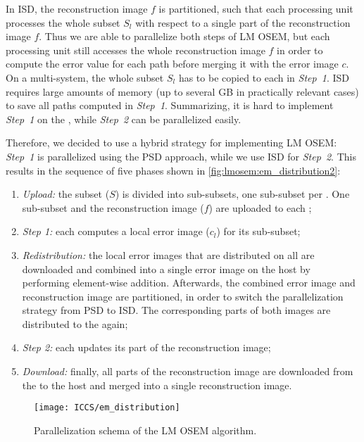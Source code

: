 In ISD, the reconstruction image $f$ is partitioned, such that each processing unit processes the whole subset $S_l$ with respect to a single part of the reconstruction image $f$.
Thus we are able to parallelize both steps of LM OSEM, but each processing unit still accesses the whole reconstruction image $f$ in order to compute the error value for each path before merging it with the error image $c$.
On a multi-\GPU system, the whole subset $S_l$ has to be copied to each \GPU in \emph{Step~1}.
ISD requires large amounts of memory (up to several GB in practically relevant cases) to save all paths computed in \emph{Step~1}.
Summarizing, it is hard to implement \emph{Step~1} on the \GPU, while \emph{Step~2} can be parallelized easily.

Therefore, we decided to use a hybrid strategy for implementing LM OSEM:
\emph{Step~1} is parallelized using the PSD approach, while we use ISD for \emph{Step~2}.
This results in the sequence of five phases shown in \autoref{fig:lmosem:em_distribution2}:
\begin{enumerate}
\item \emph{Upload:} the subset ($S$) is divided into sub-subsets, one sub-subset per \GPU.
      One sub-subset and the reconstruction image ($f$) are uploaded to each \GPU;
\item \emph{Step 1:} each \GPU computes a local error image ($c_l$) for its sub-subset;
\item \emph{Redistribution:} the local error images that are distributed on all \GPUs are downloaded and combined into a single error image on the host by performing element-wise addition.
      Afterwards, the combined error image and reconstruction image are partitioned, in order to switch the parallelization strategy from PSD to ISD.
      The corresponding parts of both images are distributed to the \GPUs again;
\item \emph{Step 2:} each \GPU updates its part of the reconstruction image;
\item \emph{Download:} finally, all parts of the reconstruction image are downloaded from the \GPUs to the host and merged into a single reconstruction image.
\end{enumerate}

\begin{figure}
  \centering
  \texttt{[image: ICCS/em\_distribution]}
  \caption{Parallelization schema of the LM OSEM algorithm.}
  \label{fig:lmosem:em_distribution2}
\end{figure}


